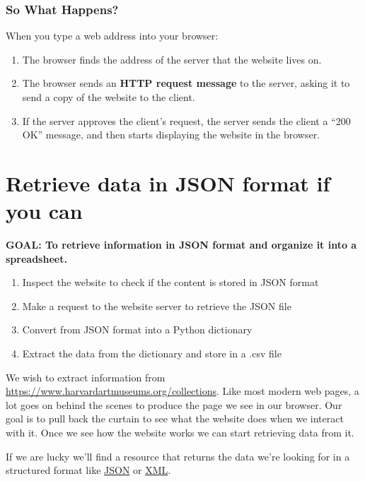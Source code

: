 \documentclass[
]{book}
\providecommand{\tightlist}{%
  \setlength{\itemsep}{0pt}\setlength{\parskip}{0pt}}
\begin{document}
\hypertarget{so-what-happens}{%
\subsubsection{So What Happens?}\label{so-what-happens}}

When you type a web address into your browser:

\begin{enumerate}
\def\labelenumi{\arabic{enumi}.}
\tightlist
\item
  The browser finds the address of the server that the website lives on.
\item
  The browser sends an \textbf{HTTP request message} to the server, asking it to send a copy of the website to the client.
\item
  If the server approves the client's request, the server sends the client a ``200 OK'' message, and then starts displaying the website in the browser.
\end{enumerate}

\hypertarget{retrieve-data-in-json-format-if-you-can}{%
\section{Retrieve data in JSON format if you can}\label{retrieve-data-in-json-format-if-you-can}}

\textbf{GOAL: To retrieve information in JSON format and organize it into a spreadsheet.}

\begin{enumerate}
\def\labelenumi{\arabic{enumi}.}
\tightlist
\item
  Inspect the website to check if the content is stored in JSON format
\item
  Make a request to the website server to retrieve the JSON file
\item
  Convert from JSON format into a Python dictionary
\item
  Extract the data from the dictionary and store in a .csv file
\end{enumerate}

We wish to extract information from
\url{https://www.harvardartmuseums.org/collections}. Like most
modern web pages, a lot goes on behind the scenes to produce the page
we see in our browser. Our goal is to pull back the curtain to see
what the website does when we interact with it. Once we see how the
website works we can start retrieving data from it.

If we are lucky we'll find a resource that returns the data we're
looking for in a structured format like \href{https://json.org/}{JSON} or
\href{https://en.wikipedia.org/wiki/XML}{XML}.
\end{document}

